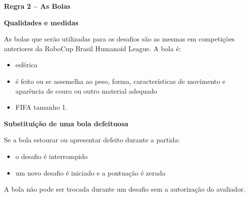 \clearpage
\sffamily
{\bfseries\color[rgb]{0.4,0.4,0.4}
Regra 2 – As Bolas}
{}


\bigskip

{\bfseries Qualidades e medidas }

\headlinebox

As bolas que serão utilizadas para os desafios são as mesmas em competições anteriores da RoboCup Brasil Humanoid League. A bola é:

\begin{itemize}
\item esférica
\item é feito ou se assemelha ao peso, forma, características de movimento e aparência de couro ou outro material adequado
\item FIFA tamanho 1.
\end{itemize}

{\bfseries Substituição de uma bola defeituosa}

\headlinebox

Se a bola estourar ou apresentar defeito durante a partida:

\begin{itemize}
\item o desafio é interrompido
\item um novo desafio é iniciado e a pontuação é zerada
\end{itemize}

A bola não pode ser trocada durante um desafio sem a autorização do avaliador.
